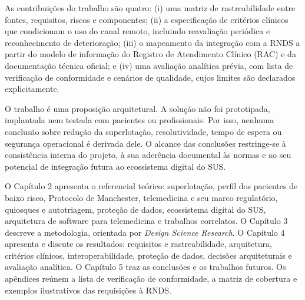 
As contribuições do trabalho são quatro: (i) uma matriz de rastreabilidade entre fontes, requisitos, riscos e componentes; (ii) a especificação de critérios clínicos que condicionam o uso do canal remoto, incluindo reavaliação periódica e reconhecimento de deterioração; (iii) o mapeamento da integração com a RNDS a partir do modelo de informação do Registro de Atendimento Clínico (RAC) e da documentação técnica oficial; e (iv) uma avaliação analítica prévia, com lista de verificação de conformidade e cenários de qualidade, cujos limites são declarados explicitamente.


O trabalho é uma proposição arquitetural. A solução não foi prototipada, implantada nem testada com pacientes ou profissionais. Por isso, nenhuma conclusão sobre redução da superlotação, resolutividade, tempo de espera ou segurança operacional é derivada dele. O alcance das conclusões restringe-se à consistência interna do projeto, à sua aderência documental às normas e ao seu potencial de integração futura ao ecossistema digital do SUS.


O Capítulo 2 apresenta o referencial teórico: superlotação, perfil dos pacientes de baixo risco, Protocolo de Manchester, telemedicina e seu marco regulatório, quiosques e autotriagem, proteção de dados, ecossistema digital do SUS, arquitetura de software para telemedicina e trabalhos correlatos. O Capítulo 3 descreve a metodologia, orientada por \textit{Design Science Research}. O Capítulo 4 apresenta e discute os resultados: requisitos e rastreabilidade, arquitetura, critérios clínicos, interoperabilidade, proteção de dados, decisões arquiteturais e avaliação analítica. O Capítulo 5 traz as conclusões e os trabalhos futuros. Os apêndices reúnem a lista de verificação de conformidade, a matriz de cobertura e exemplos ilustrativos das requisições à RNDS.
